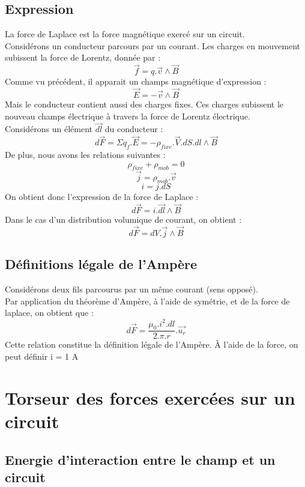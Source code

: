 \subsection{Expression}
\begin{de}
La force de Laplace est la force magnétique exercé sur un circuit.\\
Considérons un conducteur parcours par un courant. Les charges en mouvement subissent la force de Lorentz, donnée par :
$$\overrightarrow{f}=q.\overrightarrow{v}\wedge\overrightarrow{B}$$
Comme vu précédent, il apparait un champs magnétique d'expression : 
$$\overrightarrow{E}=-\overrightarrow{v}\wedge\overrightarrow{B}$$
Mais le conducteur contient aussi des charges fixes. Ces charges subissent le nouveau champs électrique à travers la force de Lorentz électrique.\\
Considérons un élément $\overrightarrow{dl}$ du conducteur : 
$$d\overrightarrow{F}=\Sigma q_f.\overrightarrow{E} = -\rho_{fixe}.\overrightarrow{V}.dS.dl\wedge\overrightarrow{B}$$
De plus, nous avons les relations suivantes : 
$$\rho_{fixe}+\rho_{mob} = 0$$
$$\overrightarrow{j} = \rho_{mob}.\overrightarrow{v}$$
$$i = j.dS$$
On obtient donc l'expression de la force de Laplace : 
$$d\overrightarrow{F} = i.\overrightarrow{dl}\wedge\overrightarrow{B}$$
Dans le cas d'un distribution volumique de courant, on obtient : 
$$d\overrightarrow{F} = dV.\overrightarrow{j}\wedge\overrightarrow{B}$$
\end{de}
\subsection{Définitions légale de l'Ampère}
\begin{de}
Considérons deux fils parcourus par un même courant (sens opposé).\\
Par application du théorème d'Ampère, à l'aide de symétrie, et de la force de laplace, on obtient que :
$$d\overrightarrow{F} = \dfrac{\mu_0.i^2.dl}{2.\pi.r}.\overrightarrow{u_r}$$
Cette relation constitue la définition légale de l'Ampère. À l'aide de la force, on peut définir i = 1 A
\end{de}
\section{Torseur des forces exercées sur un circuit}
\subsection{Energie d'interaction entre le champ et un circuit}
